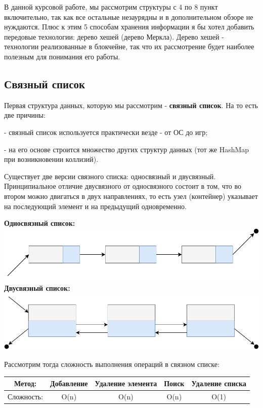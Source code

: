 \documentclass[utf8,14pt,a4paper,oneside,russian]{book}
\begin{document}
	В данной курсовой работе, мы рассмотрим структуры с 4 по 8 пункт включительно, так как все остальные незаурядны и  в дополнительном обзоре не нуждаются. Плюс к этим 5 способам хранения информации я бы хотел добавить передовые технологии: дерево хешей (дерево Меркла). Дерево хешей - технологии реализованные в блокчейне, так что их рассмотрение будет наиболее полезным для понимания его работы.
	
	\subsection{Связный список}
	
	Первая структура данных, которую мы рассмотрим - \textbf{связный список}. На то есть две причины:
	
	- связный список используется практически везде - от ОС до игр;
	
	- на его основе строится множество других структур данных (тот же HashMap при возникновении коллизий).
	
	Существует две версии связного списка: односвязный и двусвязный. Принципиальное отличие двусвязного от односвязного состоит в том, что во втором можно двигаться в двух направлениях, то есть узел (контейнер) указывает на последующий элемент и на предыдущий одновременно.
	
	\begin{center}
		\textbf{Односвязный список:}\\
		\includegraphics[scale=1]{linked_list_1}\\
		\textbf{Двусвязный список:}\\
		\includegraphics[scale=1]{linked_list_2}\\
	\end{center}
	
	Рассмотрим тогда сложность выполнения операций в связном списке:
	
	\begin{longtable}{c|c|c|c|c}
		Метод: &Добавление&Удаление элемента&Поиск&Удаление списка\\\hline
		Сложность: &O(n)&O(n)&O(n)&O(1)\\
	\end{longtable}
\end{document}

